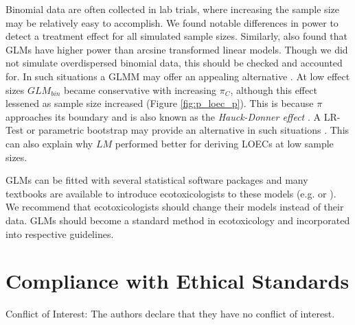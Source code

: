 \documentclass[twocolumn, natbib]{svjour3}
\begin{document}
Binomial data are often collected in lab trials, where increasing the sample size may be relatively easy to accomplish. 
We found notable differences in power to detect a treatment effect for all simulated sample sizes.
Similarly, \citet{warton_arcsine_2011} also found that GLMs have higher power than arcsine transformed linear models.
Though we did not simulate overdispersed binomial data, this should be checked and accounted for.
In such situations a GLMM may offer an appealing alternative \citep{warton_arcsine_2011}.
At low effect sizes $GLM_{bin}$ became conservative with increasing $\pi_C$, although this effect lessened as sample size increased (Figure \ref{fig:p_loec_p}). 
This is because $\pi$ approaches its boundary and is also known as the \emph{Hauck-Donner effect} \citep{hauck_walds_1977}. A LR-Test or parametric bootstrap may provide an alternative in such situations \citep{bolker_generalized_2009}.
This can also explain why $LM$ performed better for deriving LOECs at low sample sizes.

GLMs can be fitted with several statistical software packages and many textbooks are available to introduce ecotoxicologists to these models (e.g. \citealt{zuur_beginners_2013} or \citealt{quinn_experimental_2009}).
We recommend that ecotoxicologists should change their models instead of their data.
GLMs should become a standard method in ecotoxicology and incorporated into respective guidelines.


\section{Compliance with Ethical Standards}
Conflict of Interest: The authors declare that they have no conflict of interest.



\end{document}
